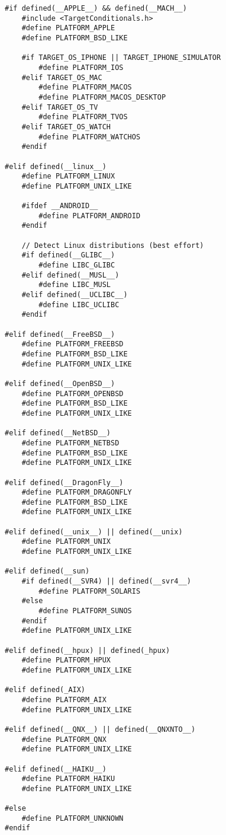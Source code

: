 \begin{lstlisting}
#if defined(__APPLE__) && defined(__MACH__)
    #include <TargetConditionals.h>
    #define PLATFORM_APPLE
    #define PLATFORM_BSD_LIKE

    #if TARGET_OS_IPHONE || TARGET_IPHONE_SIMULATOR
        #define PLATFORM_IOS
    #elif TARGET_OS_MAC
        #define PLATFORM_MACOS
        #define PLATFORM_MACOS_DESKTOP
    #elif TARGET_OS_TV
        #define PLATFORM_TVOS
    #elif TARGET_OS_WATCH
        #define PLATFORM_WATCHOS
    #endif

#elif defined(__linux__)
    #define PLATFORM_LINUX
    #define PLATFORM_UNIX_LIKE

    #ifdef __ANDROID__
        #define PLATFORM_ANDROID
    #endif

    // Detect Linux distributions (best effort)
    #if defined(__GLIBC__)
        #define LIBC_GLIBC
    #elif defined(__MUSL__)
        #define LIBC_MUSL
    #elif defined(__UCLIBC__)
        #define LIBC_UCLIBC
    #endif

#elif defined(__FreeBSD__)
    #define PLATFORM_FREEBSD
    #define PLATFORM_BSD_LIKE
    #define PLATFORM_UNIX_LIKE

#elif defined(__OpenBSD__)
    #define PLATFORM_OPENBSD
    #define PLATFORM_BSD_LIKE
    #define PLATFORM_UNIX_LIKE

#elif defined(__NetBSD__)
    #define PLATFORM_NETBSD
    #define PLATFORM_BSD_LIKE
    #define PLATFORM_UNIX_LIKE

#elif defined(__DragonFly__)
    #define PLATFORM_DRAGONFLY
    #define PLATFORM_BSD_LIKE
    #define PLATFORM_UNIX_LIKE

#elif defined(__unix__) || defined(__unix)
    #define PLATFORM_UNIX
    #define PLATFORM_UNIX_LIKE

#elif defined(__sun)
    #if defined(__SVR4) || defined(__svr4__)
        #define PLATFORM_SOLARIS
    #else
        #define PLATFORM_SUNOS
    #endif
    #define PLATFORM_UNIX_LIKE

#elif defined(__hpux) || defined(_hpux)
    #define PLATFORM_HPUX
    #define PLATFORM_UNIX_LIKE

#elif defined(_AIX)
    #define PLATFORM_AIX
    #define PLATFORM_UNIX_LIKE

#elif defined(__QNX__) || defined(__QNXNTO__)
    #define PLATFORM_QNX
    #define PLATFORM_UNIX_LIKE

#elif defined(__HAIKU__)
    #define PLATFORM_HAIKU
    #define PLATFORM_UNIX_LIKE

#else
    #define PLATFORM_UNKNOWN
#endif


\end{lstlisting}

